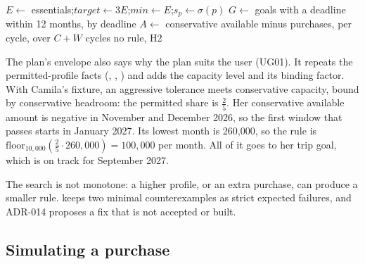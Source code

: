 \begin{algorithm}[htbp]
  \caption{Plan sizing (\texttt{size\_plan}).}\label{alg:plan}
  $E \gets$ essentials;\quad $\mathit{target} \gets 3E$;\quad $\mathit{min} \gets E$;\quad $s_p \gets \sigma(p)$\;
  $G \gets$ goals with a deadline within 12 months, by deadline\;
  $A \gets$ conservative available minus purchases, per cycle, over $C + W$ cycles\;
  \Return no rule, H2\;
\end{algorithm}

The plan's envelope also says why the plan suits the user (UG01). It repeats the permitted-profile facts
(, , ) and adds the capacity level and its
binding factor. With Camila's fixture, an aggressive tolerance meets conservative capacity, bound by conservative
headroom: the permitted share is $\tfrac25$. Her conservative available amount is negative in November and December
2026, so the first window that passes starts in January 2027. Its lowest month is 260{,}000, so the rule is
$\mathrm{floor}_{10{,}000}(\tfrac25 \cdot 260{,}000) = 100{,}000$ per month. All of it goes to her trip goal, which is
on track for September 2027.

The search is not monotone: a higher profile, or an extra purchase, can produce a smaller rule.
 keeps two minimal counterexamples as strict expected failures, and
ADR-014 proposes a fix that is not accepted or built.

\subsection{Simulating a purchase}\label{sec:purchase}

